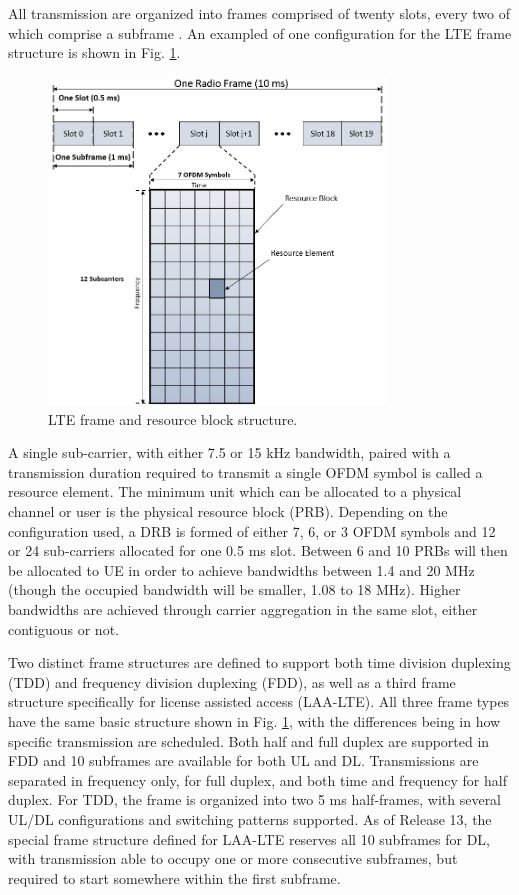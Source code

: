 All transmission are organized into frames comprised of twenty slots, every two of which comprise a subframe \cite{tr36211}. An exampled of one configuration for the LTE frame structure is shown in Fig. \ref{lte:frame}.
\begin{figure}[!t]
	\centering
	\includegraphics[width=0.8\textwidth]{figures3/LTE-frame}
	\caption{LTE frame and resource block structure.}
	\label{lte:frame}
\end{figure}
A single sub-carrier, with either 7.5 or 15 kHz bandwidth, paired with a transmission duration required to transmit a single OFDM symbol is called a resource element. The minimum unit which can be allocated to a physical channel or user is the physical resource block (PRB). Depending on the configuration used, a DRB is formed of either 7, 6, or 3 OFDM symbols and 12 or 24 sub-carriers allocated for one 0.5 ms slot.  Between 6 and 10 PRBs will then be allocated to UE in order to achieve bandwidths between 1.4 and 20 MHz (though the occupied bandwidth will be smaller, 1.08 to 18 MHz).  Higher bandwidths are achieved through carrier aggregation in the same slot, either contiguous or not. 

Two distinct frame structures are defined to support both time division duplexing (TDD) and frequency division duplexing (FDD), as well as a third frame structure specifically for license assisted access (LAA-LTE).  All three frame types have the same basic structure shown in Fig. \ref{lte:frame}, with the differences being in how specific transmission are scheduled.  Both half and full duplex are supported in FDD and 10 subframes are available for both UL and DL.  Transmissions are separated in frequency only, for full duplex, and both time and frequency for half duplex.  For TDD, the frame is organized into two 5 ms half-frames, with several UL/DL configurations and switching patterns supported.  As of Release 13, the special frame structure defined for LAA-LTE reserves all 10 subframes for DL, with transmission able to occupy one or more consecutive subframes, but required to start somewhere within the first subframe.

